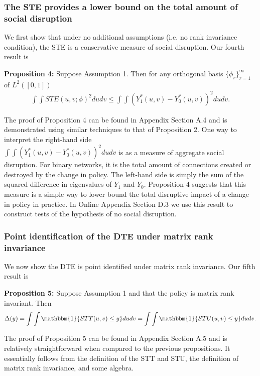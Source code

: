 \documentclass[12pt]{article}
\theoremstyle{definition}
\begin{document}
\subsubsection{The STE provides a lower bound on the total amount of social disruption}
We first show that under no additional assumptions (i.e. no rank invariance condition), the STE is a conservative measure of social disruption. Our fourth result is 
 \begin{flushleft}
\textbf{Proposition 4:} Suppose Assumption 1. Then for any orthogonal basis $\{\phi_{r}\}_{r=1}^{\infty}$ of $L^{2}([0,1])$
\begin{align}\label{HWineq}  
\int\int STE(u,v;\phi)^{2}dudv \leq \int\int\left(Y_{1}^{*}(u,v)-Y_{0}^{*}(u,v)\right)^{2}dudv.
\end{align}
\end{flushleft}   
The proof of Proposition 4 can be found in Appendix Section A.4 and is demonstrated using similar techniques to that of Proposition 2.  One way to interpret the right-hand side \\ $\int\int\left(Y_{1}^{*}(u,v)-Y_{0}^{*}(u,v)\right)^{2}dudv$ is as a measure of aggregate social disruption. For binary networks, it is the total amount of connections created or destroyed by the change in policy. The left-hand side is simply the sum of the squared difference in eigenvalues of $Y_{1}$ and $Y_{0}$. Proposition 4 suggests that this measure is a simple way to lower bound the total disruptive impact of a change in policy in practice. In Online Appendix Section D.3 we use this result to construct tests of the hypothesis of no social disruption.  

 \subsubsection{Point identification of the DTE under matrix rank invariance}
We now show the DTE is point identified under matrix rank invariance. Our fifth result is   
 \begin{flushleft}
\textbf{Proposition 5:} Suppose Assumption 1 and that the policy is matrix rank invariant. Then
\begin{align}
\Delta(y) = \int\int\mathbbm{1}\{STT(u,v) \leq y\}dudv =  \int\int\mathbbm{1}\{STU(u,v) \leq y\}dudv.
\end{align}
\end{flushleft}
The proof of Proposition 5 can be found in Appendix Section A.5 and is relatively straightforward when compared to the previous propositions. It essentially follows from the definition of the STT and STU, the definition of matrix rank invariance, and some algebra. 
\end{document}
